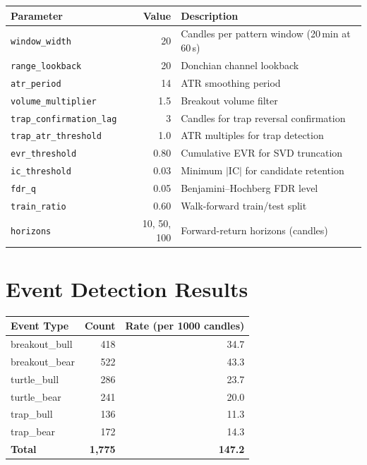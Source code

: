 \documentclass[11pt,a4paper]{article}
\begin{document}
\begin{center}
\small
\begin{tabular}{lrl}
\hline
\textbf{Parameter} & \textbf{Value} & \textbf{Description} \\
\hline
\texttt{window\_width}            & 20         & Candles per pattern window (20\,min at 60\,s) \\
\texttt{range\_lookback}          & 20         & Donchian channel lookback \\
\texttt{atr\_period}              & 14         & ATR smoothing period \\
\texttt{volume\_multiplier}       & 1.5        & Breakout volume filter \\
\texttt{trap\_confirmation\_lag}  & 3          & Candles for trap reversal confirmation \\
\texttt{trap\_atr\_threshold}     & 1.0        & ATR multiples for trap detection \\
\texttt{evr\_threshold}           & 0.80       & Cumulative EVR for SVD truncation \\
\texttt{ic\_threshold}            & 0.03       & Minimum $|\text{IC}|$ for candidate retention \\
\texttt{fdr\_q}                   & 0.05       & Benjamini--Hochberg FDR level \\
\texttt{train\_ratio}             & 0.60       & Walk-forward train/test split \\
\texttt{horizons}                 & 10, 50, 100 & Forward-return horizons (candles) \\
\hline
\end{tabular}
\end{center}

\section{Event Detection Results}

\begin{center}
\begin{tabular}{lrr}
\hline
\textbf{Event Type} & \textbf{Count} & \textbf{Rate (per 1000 candles)} \\
\hline
breakout\_bull  & 418 & 34.7 \\
breakout\_bear  & 522 & 43.3 \\
turtle\_bull    & 286 & 23.7 \\
turtle\_bear    & 241 & 20.0 \\
trap\_bull      & 136 & 11.3 \\
trap\_bear      & 172 & 14.3 \\
\hline
\textbf{Total}  & \textbf{1,775} & \textbf{147.2} \\
\hline
\end{tabular}
\end{center}
\end{document}

